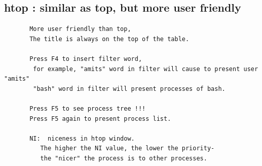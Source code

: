 \documentclass[a4paper,12pt]{article}
\begin{document}
\subsection{htop     : similar as top, but more user friendly }
\begin{verbatim}
       More user friendly than top, 
       The title is always on the top of the table.
       
       Press F4 to insert filter word,
        for example, "amits" word in filter will cause to present user "amits"
        "bash" word in filter will present processes of bash.       
            
       Press F5 to see process tree !!!
       Press F5 again to present process list.  
        
       NI:  niceness in htop window. 
          The higher the NI value, the lower the priority-
          the "nicer" the process is to other processes.

\end{verbatim}
\end{document}
